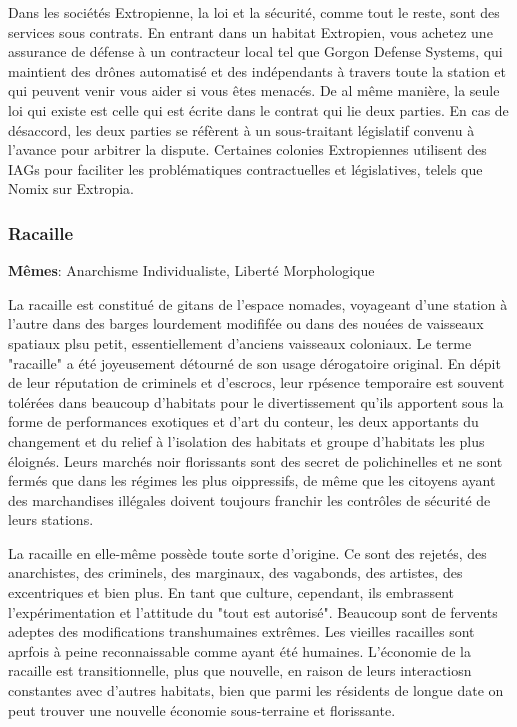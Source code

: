                                     Dans les sociétés Extropienne, la loi et la sécurité, comme tout le reste, sont des services sous contrats. En entrant dans un habitat Extropien, vous achetez une assurance de défense à un contracteur local tel que Gorgon Defense Systems, qui maintient des drônes automatisé et des indépendants à travers toute la station et qui peuvent venir vous aider si vous êtes menacés. De al même manière, la seule loi qui existe est celle qui est écrite dans le contrat qui lie deux parties. En cas de désaccord, les deux parties se réfèrent à un sous-traitant législatif convenu à l'avance pour arbitrer la dispute. Certaines colonies Extropiennes utilisent des IAGs pour faciliter les problématiques contractuelles et législatives, telels que Nomix sur Extropia. 

                                    \subsubsection{Racaille} \label{sec:scum} 

                                    \textbf{Mêmes}: Anarchisme Individualiste, Liberté Morphologique 

                                    La racaille est constitué de gitans de l'espace nomades, voyageant d'une station à l'autre dans des barges lourdement modififée ou dans des nouées de vaisseaux spatiaux plsu petit, essentiellement d'anciens vaisseaux coloniaux. Le terme "racaille" a été joyeusement détourné de son usage dérogatoire original. En dépit de leur réputation de criminels et d'escrocs, leur rpésence temporaire est souvent tolérées dans beaucoup d'habitats pour le divertissement qu'ils apportent sous la forme de performances exotiques et d'art du conteur, les deux apportants du changement et du relief à l'isolation des habitats et groupe d'habitats les plus éloignés. Leurs marchés noir florissants sont des secret de polichinelles et ne sont fermés que dans les régimes les plus oippressifs, de même que les citoyens ayant des marchandises illégales doivent toujours franchir les contrôles de sécurité de leurs stations. 

                                    La racaille en elle-même possède toute sorte d'origine. Ce sont des rejetés, des anarchistes, des criminels, des marginaux, des vagabonds, des artistes, des excentriques et bien plus. En tant que culture, cependant, ils embrassent l'expérimentation et l'attitude du "tout est autorisé". Beaucoup sont de fervents adeptes des modifications transhumaines extrêmes. Les vieilles racailles sont aprfois à peine reconnaissable comme ayant été humaines. L'économie de la racaille est transitionnelle, plus que nouvelle, en raison de leurs interactiosn constantes avec d'autres habitats, bien que parmi les résidents de longue date on peut trouver une nouvelle économie sous-terraine et florissante. 

